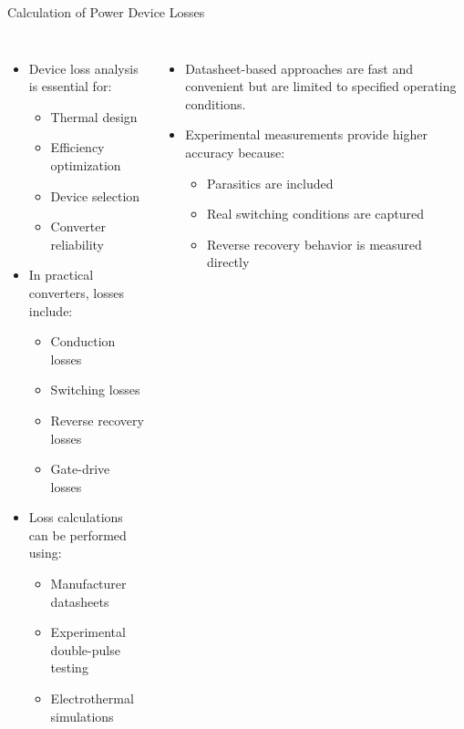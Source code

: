 \begin{frame}{Calculation of Power Device Losses}
\begin{columns}[T]

\begin{itemize}
    \item Device loss analysis is essential for:
    \begin{itemize}
        \item Thermal design
        \item Efficiency optimization
        \item Device selection
        \item Converter reliability
    \end{itemize}

    \item In practical converters, losses include:
    \begin{itemize}
        \item Conduction losses
        \item Switching losses
        \item Reverse recovery losses
        \item Gate-drive losses
    \end{itemize}

    \item Loss calculations can be performed using:
    \begin{itemize}
        \item Manufacturer datasheets
        \item Experimental double-pulse testing
        \item Electrothermal simulations
    \end{itemize}
\end{itemize}
\begin{itemize}
    \item Datasheet-based approaches are fast and convenient but are limited to specified operating conditions.
    
    \item Experimental measurements provide higher accuracy because:
    \begin{itemize}
        \item Parasitics are included
        \item Real switching conditions are captured
        \item Reverse recovery behavior is measured directly
    \end{itemize}
\end{itemize}
\end{columns}
\end{frame}



